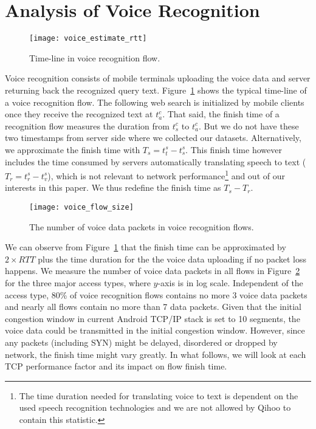 
\section{Analysis of Voice Recognition}

\begin{figure}[th]
\centering
	\texttt{[image: voice\_estimate\_rtt]}
\caption{Time-line in voice recognition flow.}
\label{fig:voice_estimate_rtt}
\end{figure}

Voice recognition consists of mobile terminals uploading the voice data and server returning back the recognized query text. Figure~\ref{fig:voice_estimate_rtt} shows the typical time-line of a voice recognition flow. The following web search is initialized by mobile clients once they receive the recognized text at $t^c_a$. That said, the finish time of a recognition flow measures the duration from $t^c_s$ to $t^c_a$. But we do not have these two timestamps from server side where we collected our datasets. Alternatively, we approximate the finish time with $T_s=t^s_t - t^s_s$. This finish time however includes the time consumed by servers automatically translating speech to text ($T_r=t^s_r - t^s_v$), which is not relevant to network performance\footnote{The time duration needed for translating voice to text is dependent on the used speech recognition technologies and we are not allowed by Qihoo to contain this statistic.} and out of our interests in this paper. We thus redefine the finish time as $T_s-T_r$.

\begin{figure}[th]
	\centering
	\texttt{[image: voice\_flow\_size]}
	\caption{The number of voice data packets in voice recognition flows.}
	\label{fig:voice_flow_size}
\end{figure}

We can observe from Figure~\ref{fig:voice_estimate_rtt} that the finish time can be approximated by $2\times RTT$ plus the time duration for the the voice data uploading if no packet loss happens. We measure the number of voice data packets in all flows in Figure~\ref{fig:voice_flow_size} for the three major access types, where $y$-axis is in log scale. Independent of the access type, 80\% of voice recognition flows contains no more 3 voice data packets and nearly all flows contain no more than 7 data packets. Given that the initial congestion window in current Android TCP/IP stack is set to 10 segments\cite{dukkipati2010argument}, the voice data could be transmitted in the initial congestion window. However, since any packets (including SYN) might be delayed, disordered or dropped by network, the finish time might vary greatly. In what follows, we will look at each TCP performance factor and its impact on flow finish time. 


